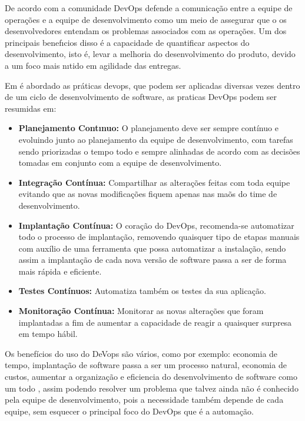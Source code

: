 De acordo com \cite{httermann2012devops} a comunidade DevOps defende a comunicação
entre a equipe de operações e a equipe de desenvolvimento como um meio de assegurar
que o os desenvolvedores entendam os problemas associados com as operações. Um dos
principais benefıcios disso é a capacidade de quantificar aspectos do desenvolvimento,
isto é, levar a melhoria do desenvolvimento do produto, devido a um foco mais nıtido
em agilidade das entregas.

Em \cite{7173368} é abordado as práticas devops, que podem ser aplicadas diversas
 vezes dentro de um ciclo de desenvolvimento de software, as praticas DevOps podem ser resumidas em:

 \begin{itemize}
   \item \textbf{Planejamento Contınuo:} O planejamento deve ser sempre contínuo
   e evoluindo junto ao planejamento da equipe de desenvolvimento, com tarefas
   sendo priorizadas o tempo todo e sempre alinhadas de acordo com as decisões tomadas
   em conjunto com a equipe de desenvolvimento.
   \item \textbf{Integração Contínua:} Compartilhar as alterações feitas com toda equipe
   evitando que as novas modificações fiquem apenas nas maõs do time de desenvolvimento.
   \item \textbf{Implantação Contínua:} O coração do DevOps, recomenda-se automatizar
   todo o processo de implantação, removendo quaisquer tipo de etapas manuais com auxílio
   de uma ferramenta que possa automatizar a instalação, sendo assim a implantação
   de cada nova versão de software passa a ser de forma mais rápida e eficiente.
   \item \textbf{Testes Contínuos:} Automatiza também os testes da sua aplicação.
   \item \textbf{Monitoração Contínua:} Monitorar as novas alterações
   que foram implantadas a fim de aumentar a capacidade de reagir a quaisquer surpresa
   em tempo hábil.
 \end{itemize}

 Os benefícios do uso do DeVops são vários, como por exemplo: economia de tempo,
 implantação de software passa a ser um processo natural, economia de custos, aumentar
 a organização e eficiencia do desenvolvimento de software como um todo \cite{7173368},
 assim podendo resolver um problema que talvez ainda não é conhecido pela equipe
 de desenvolvimento, pois a necessidade também depende de cada equipe, sem
 esquecer o principal foco do DevOps que é a automação.

